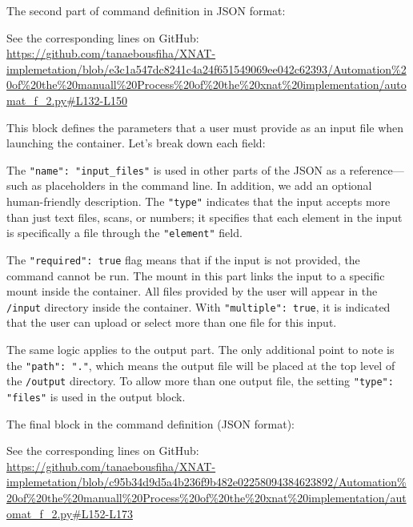The second part of command definition in JSON format:




\noindent\footnotesize See the corresponding lines on GitHub: \url{ https://github.com/tanaebousfiha/XNAT-implemetation/blob/e3c1a547dc8241c4a24f651549069ee042c62393/Automation%20of%20the%20manuall%20Process%20of%20the%20xnat%20implementation/automat_f_2.py#L132-L150}


This block defines the parameters that a user must provide as an input file when launching the container.
Let’s break down each field:

The \texttt{"name": "input\_files"} is used in other parts of the JSON as a reference---such as placeholders in the command line. In addition, we add an optional human-friendly description. The \texttt{"type"} indicates that the input accepts more than just text files, scans, or numbers; it specifies that each element in the input is specifically a file through the \texttt{"element"} field.

The \texttt{"required": true} flag means that if the input is not provided, the command cannot be run. The mount in this part links the input to a specific mount inside the container. All files provided by the user will appear in the \texttt{/input} directory inside the container. With \texttt{"multiple": true}, it is indicated that the user can upload or select more than one file for this input.

The same logic applies to the output part. The only additional point to note is the \texttt{"path": "."}, which means the output file will be placed at the top level of the \texttt{/output} directory. To allow more than one output file, the setting \texttt{"type": "files"} is used in the output block.

The final block in the command definition (JSON format):




\noindent\footnotesize See the corresponding lines on GitHub:\url{ https://github.com/tanaebousfiha/XNAT-implemetation/blob/c95b34d9d5a4b236f9b482e02258094384623892/Automation%20of%20the%20manuall%20Process%20of%20the%20xnat%20implementation/automat_f_2.py#L152-L173}




